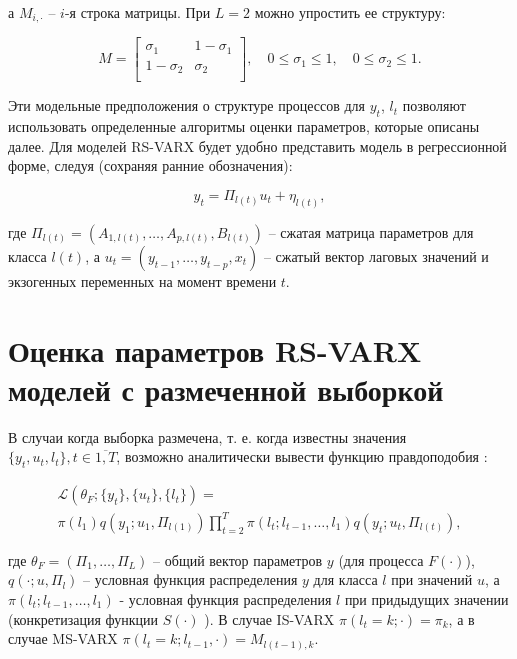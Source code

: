 \documentclass[a4paper,14pt]{extreport}
\begin{document}
а $M_{i, \cdot}$ -- $i$-я строка матрицы. При $L=2$ можно упростить ее структуру:

\begin{equation}
	M=
	\left[ {
				\begin{array}{cc}
					\sigma_{1}   & 1-\sigma_{1} \\
					1-\sigma_{2} & \sigma_{2}   \\
				\end{array}
			} \right]
	, \quad 
	0 \le \sigma_{1} \le 1
	, \quad 
	0 \le \sigma_{2} \le 1
	.
\end{equation}

Эти модельные предположения о структуре процессов для $y_t$, $l_t$ позволяют использовать определенные алгоритмы оценки параметров, которые описаны далее. Для моделей RS-VARX будет удобно представить модель в регрессионной форме, следуя \cite{malNovopMSVARX} (сохраняя ранние обозначения):

\begin{equation}
	\label{eq:rs_varx_as_regression}
	y_t = \Pi_{l(t)} u_t + \eta_{l(t)} ,
\end{equation}

\noindent
где $ \Pi_{l(t)} = (A_{1, l(t)}, \dots, A_{p, l(t)}, B_{l(t)}) $ -- сжатая матрица параметров для класса $l(t)$, 
а $ u_t = (y_{t-1}, \dots, y_{t-p}, x_{t}) $ -- сжатый вектор лаговых значений и экзогенных переменных на момент времени $t$.

\section{Оценка параметров RS-VARX моделей с размеченной выборкой}

В случаи когда выборка размечена, т. е. когда известны значения $\{y_t, u_t, l_t\}, t \in \overline{1,T}$, возможно аналитически вывести функцию правдоподобия \cite{malNovopMSVARX}:

\begin{equation}
	\label{eq:rs_varx_loglike}
	\begin{multlined}
		\mathcal{L}(\theta_F; \{y_t\}, \{u_t\}, \{l_t\}) ={} \\
		\pi(l_1) q(y_1; u_1, \Pi_{l(1)}) 
		\prod\limits_{t=2}^{T}{ 
		\pi(l_t; l_{t-1}, \dots, l_1) q(y_t; u_t, \Pi_{l(t)}) 
		} ,
	\end{multlined}
\end{equation}

\noindent
где $\theta_F = (\Pi_1, \dots, \Pi_L)$ -- общий вектор параметров $y$ (для процесса $F(\cdot)$), $q(\cdot; u, \Pi_l)$ -- условная функция распределения $y$ для класса $l$ при значений $u$, а $\pi(l_t; l_{t-1}, \dots, l_1)$ - условная функция распределения $l$ при придыдущих значении (конкретизация функции $S(\cdot)$ ). В случае IS-VARX $\pi(l_t = k; \cdot) = \pi_k$, а в случае MS-VARX $\pi(l_t = k; l_{t-1}, \cdot) = M_{l(t-1), k}$.
\end{document}
